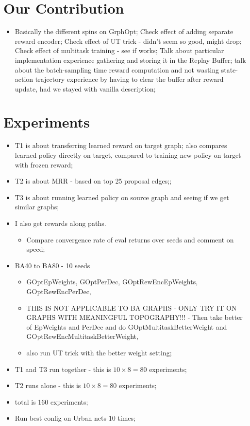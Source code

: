 \documentclass{report}
\numberwithin{equation}{section}
\numberwithin{figure}{section}
\numberwithin{table}{section}
\begin{document}
\chapter{Our Contribution}
\begin{itemize}
  \item Basically the different spins on GrphOpt;
    \subitem Check effect of adding separate reward encoder;
    \subitem Check effect of UT trick - didn't seem so good, might drop;
    \subitem Check effect of multitask training - see if works;
    \subitem Talk about particular implementation experience
      gathering and storing it in the Replay Buffer; talk about 
      the batch-sampling time reward computation and not wasting 
      state-action trajectory experience by having to clear the 
      buffer after reward update, had we stayed with vanilla description;
\end{itemize}

\chapter{Experiments}
\begin{itemize}
  \item T1 is about transferring learned reward on target graph;
  also compares learned policy directly on target, compared to 
  training new policy on target with frozen reward;
  \item T2 is about MRR - based on top 25 proposal edges;;
  \item T3 is about running learned policy on source graph and 
  seeing if we get similar graphs;
  \item I also get rewards along paths.
  \begin{itemize}
    \item Compare convergence rate of eval returns over seeds
      and comment on speed;
  \end{itemize}
  \item BA40 to BA80 - 10 seeds
  \begin{itemize}
    \item GOptEpWeights, GOptPerDec, 
      GOptRewEncEpWeights, GOptRewEncPerDec,
    \item THIS IS NOT APPLICABLE TO BA GRAPHS - ONLY TRY IT ON GRAPHS 
      WITH MEANINGFUL TOPOGRAPHY!!! - Then take better of EpWeights and PerDec and do 
      GOptMultitaskBetterWeight and GOptRewEncMultitaskBetterWeight,
    \item also run UT trick with the better weight setting;
  \end{itemize}
    
  \item T1 and T3 run together - this is $10\times 8=80$ experiments;
  \item T2 runs alone - this is $10\times 8=80$ experiments;
  \item total is 160 experiments;
  \item  Run best config on Urban nets 10 times;
\end{itemize}
\end{document}
